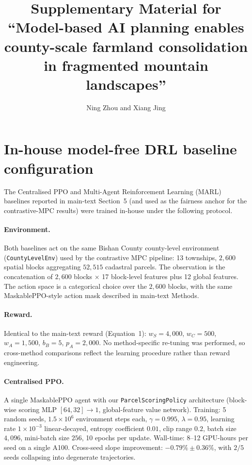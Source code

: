 \documentclass[11pt]{article}
\title{Supplementary Material for ``Model-based AI planning enables county-scale farmland consolidation in fragmented mountain landscapes''}
\author{Ning Zhou and Xiang Jing}
\date{}
\begin{document}
\maketitle
\sloppy  %

\section{In-house model-free DRL baseline configuration}\label{si:s1-drl}

The Centralised PPO and Multi-Agent Reinforcement Learning (MARL) baselines reported in main-text Section~5 (and used as the fairness anchor for the contrastive-MPC results) were trained in-house under the following protocol.

\paragraph{Environment.} Both baselines act on the same Bishan County county-level environment (\texttt{CountyLevelEnv}) used by the contrastive MPC pipeline: 13 townships, $2{,}600$ spatial blocks aggregating $52{,}515$ cadastral parcels. The observation is the concatenation of $2{,}600$ blocks $\times$ 17 block-level features plus 12 global features. The action space is a categorical choice over the $2{,}600$ blocks, with the same MaskablePPO-style action mask described in main-text Methods.

\paragraph{Reward.} Identical to the main-text reward (Equation~1): $w_S = 4{,}000$, $w_C = 500$, $w_A = 1{,}500$, $b_B = 5$, $p_A = 2{,}000$. No method-specific re-tuning was performed, so cross-method comparisons reflect the learning procedure rather than reward engineering.

\paragraph{Centralised PPO.} A single MaskablePPO agent with our \texttt{ParcelScoringPolicy} architecture (block-wise scoring MLP $[64, 32] \to 1$, global-feature value network). Training: 5 random seeds, $1.5 \times 10^6$ environment steps each, $\gamma = 0.995$, $\lambda = 0.95$, learning rate $1\times 10^{-3}$ linear-decayed, entropy coefficient $0.01$, clip range $0.2$, batch size $4{,}096$, mini-batch size $256$, 10 epochs per update. Wall-time: 8--12 GPU-hours per seed on a single A100. Cross-seed slope improvement: $-0.79\% \pm 0.36\%$, with $2/5$ seeds collapsing into degenerate trajectories.
\end{document}
